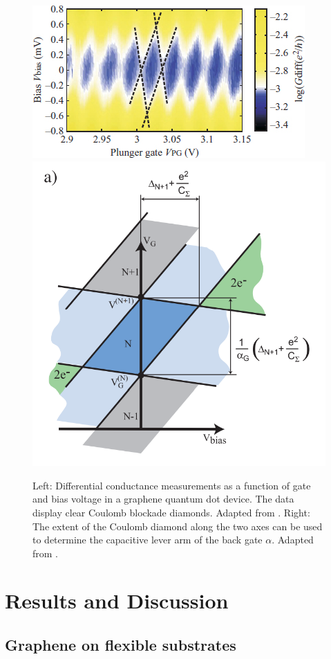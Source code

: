 \documentclass[edeposit,fullpage,draftthesis]{uiucthesis2009}
\begin{document}
            \begin{figure}
                \centering
                \includegraphics[width=0.6\linewidth]{images/experimentaltechniques/cb_diamond.jpg}
                \includegraphics[width=0.39\linewidth]{images/experimentaltechniques/cb_slope.png}
                \caption[Coulomb blockade diamonds in graphene]{
                    Left: Differential conductance measurements as a function of gate and bias voltage in a 
                    graphene quantum dot device. The data display clear Coulomb blockade diamonds.
                    Adapted from \cite{guttinger2008coulomb}.
                    Right: The extent of the Coulomb diamond along the two axes can be used to
                    determine the capacitive lever arm of the back gate $\alpha$.
                    Adapted from \cite{cb_lecture07}.
                    }
                \label{fig:cb_diamond}
            \end{figure}
            
            
    
\chapter{Results and Discussion}

\section{Graphene on flexible substrates}
\end{document}
